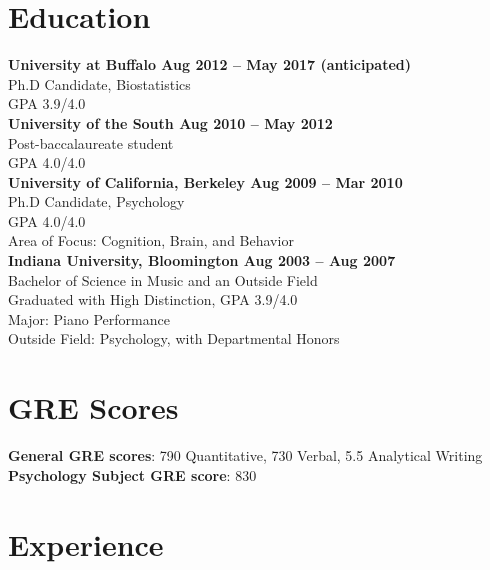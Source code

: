 \documentclass[margin]{res}
\begin{document}
 
 
 
\address{ 
}
\address{
    \hfill alexanderhfoss@gmail.com
}
 

\begin{resume} 
 
\section{Education} 
 {\bf University at Buffalo \hfill Aug 2012 -- May 2017 (anticipated)}\\
 Ph.D Candidate, Biostatistics \\
 GPA 3.9/4.0\\
 {\bf University of the South \hfill Aug 2010 -- May 2012}\\
 Post-baccalaureate student\\
 GPA 4.0/4.0\\
 {\bf University of California, Berkeley \hfill Aug 2009 -- Mar 2010}\\
 Ph.D Candidate, Psychology\\
 GPA 4.0/4.0\\
 Area of Focus: Cognition, Brain, and Behavior\\
 {\bf Indiana University, Bloomington    \hfill Aug 2003 -- Aug 2007}\\
 Bachelor of Science in Music and an Outside Field\\
 Graduated with High Distinction, GPA 3.9/4.0\\
 Major: Piano Performance\\ 
 Outside Field: Psychology, with Departmental Honors


\section{GRE Scores}
 {\bf General GRE scores}: 790 Quantitative, 730 Verbal, 5.5 Analytical Writing\\
 {\bf Psychology Subject GRE score}: 830


\section{Experience}


\end{resume}
\end{document}
